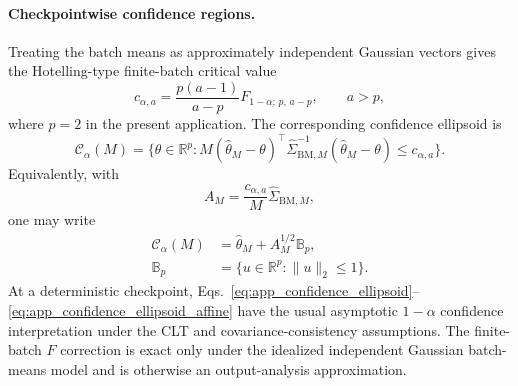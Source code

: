 \documentclass[showpacs,amsmath,amssymb,twocolumn,prx,superscriptaddress,10pt,aps,nofootinbib]{revtex4-2}
\begin{document}
\paragraph{Checkpointwise confidence regions.}
Treating the batch means as approximately independent Gaussian vectors gives the Hotelling-type finite-batch critical value
\begin{equation}
\label{eq:app_hotelling_critical}
    c_{\alpha,a}
    =
    \frac{p(a-1)}{a-p}
    F_{1-\alpha;\,p,\,a-p},
    \qquad a>p,
\end{equation}
where $p=2$ in the present application.  The corresponding confidence ellipsoid is
\begin{equation}
\label{eq:app_confidence_ellipsoid}
    \mathcal C_\alpha(M)
    =
    \{\theta\in\mathbb R^p:  M(\widehat\theta_M-\theta)^\top
    \widehat\Sigma_{\mathrm{BM},M}^{-1}
    (\widehat\theta_M-\theta) \le c_{\alpha,a}\}.
\end{equation}
Equivalently, with
\begin{equation}
\label{eq:app_A_definition}
    A_M
    =
    \frac{c_{\alpha,a}}{M}
    \widehat\Sigma_{\mathrm{BM},M},
\end{equation}
one may write
\begin{equation}
\label{eq:app_confidence_ellipsoid_affine}
\begin{aligned}
    \mathcal C_\alpha(M)
    &=
    \widehat\theta_M+A_M^{1/2}\mathbb B_p,\\
    \mathbb B_p
    &=
    \{u\in\mathbb R^p:\|u\|_2\le1\}.
\end{aligned}
\end{equation}
At a deterministic checkpoint, Eqs.~\eqref{eq:app_confidence_ellipsoid}--
\eqref{eq:app_confidence_ellipsoid_affine} have the usual asymptotic
$1-\alpha$ confidence interpretation under the CLT and covariance-consistency assumptions.
The finite-batch $F$ correction is exact only under the idealized independent Gaussian
batch-means model and is otherwise an output-analysis approximation.
\end{document}
